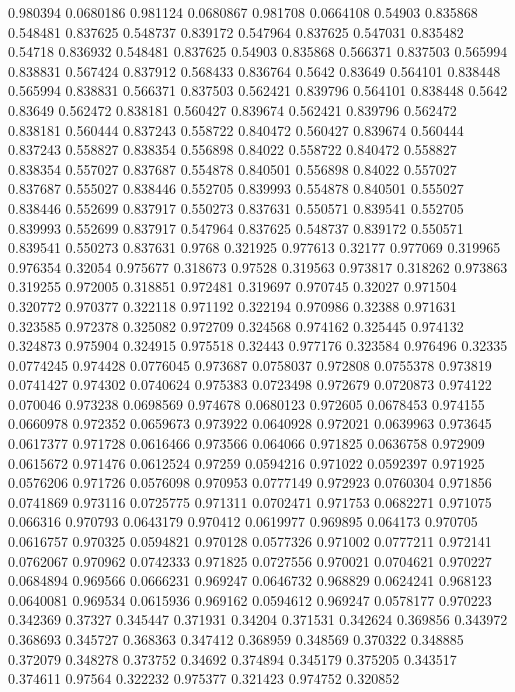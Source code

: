 0.980394 0.0680186
0.981124 0.0680867
0.981708 0.0664108
0.54903 0.835868
0.548481 0.837625
0.548737 0.839172
0.547964 0.837625
0.547031 0.835482
0.54718 0.836932
0.548481 0.837625
0.54903 0.835868
0.566371 0.837503
0.565994 0.838831
0.567424 0.837912
0.568433 0.836764
0.5642 0.83649
0.564101 0.838448
0.565994 0.838831
0.566371 0.837503
0.562421 0.839796
0.564101 0.838448
0.5642 0.83649
0.562472 0.838181
0.560427 0.839674
0.562421 0.839796
0.562472 0.838181
0.560444 0.837243
0.558722 0.840472
0.560427 0.839674
0.560444 0.837243
0.558827 0.838354
0.556898 0.84022
0.558722 0.840472
0.558827 0.838354
0.557027 0.837687
0.554878 0.840501
0.556898 0.84022
0.557027 0.837687
0.555027 0.838446
0.552705 0.839993
0.554878 0.840501
0.555027 0.838446
0.552699 0.837917
0.550273 0.837631
0.550571 0.839541
0.552705 0.839993
0.552699 0.837917
0.547964 0.837625
0.548737 0.839172
0.550571 0.839541
0.550273 0.837631
0.9768 0.321925
0.977613 0.32177
0.977069 0.319965
0.976354 0.32054
0.975677 0.318673
0.97528 0.319563
0.973817 0.318262
0.973863 0.319255
0.972005 0.318851
0.972481 0.319697
0.970745 0.32027
0.971504 0.320772
0.970377 0.322118
0.971192 0.322194
0.970986 0.32388
0.971631 0.323585
0.972378 0.325082
0.972709 0.324568
0.974162 0.325445
0.974132 0.324873
0.975904 0.324915
0.975518 0.32443
0.977176 0.323584
0.976496 0.32335
0.0774245 0.974428
0.0776045 0.973687
0.0758037 0.972808
0.0755378 0.973819
0.0741427 0.974302
0.0740624 0.975383
0.0723498 0.972679
0.0720873 0.974122
0.070046 0.973238
0.0698569 0.974678
0.0680123 0.972605
0.0678453 0.974155
0.0660978 0.972352
0.0659673 0.973922
0.0640928 0.972021
0.0639963 0.973645
0.0617377 0.971728
0.0616466 0.973566
0.064066 0.971825
0.0636758 0.972909
0.0615672 0.971476
0.0612524 0.97259
0.0594216 0.971022
0.0592397 0.971925
0.0576206 0.971726
0.0576098 0.970953
0.0777149 0.972923
0.0760304 0.971856
0.0741869 0.973116
0.0725775 0.971311
0.0702471 0.971753
0.0682271 0.971075
0.066316 0.970793
0.0643179 0.970412
0.0619977 0.969895
0.064173 0.970705
0.0616757 0.970325
0.0594821 0.970128
0.0577326 0.971002
0.0777211 0.972141
0.0762067 0.970962
0.0742333 0.971825
0.0727556 0.970021
0.0704621 0.970227
0.0684894 0.969566
0.0666231 0.969247
0.0646732 0.968829
0.0624241 0.968123
0.0640081 0.969534
0.0615936 0.969162
0.0594612 0.969247
0.0578177 0.970223
0.342369 0.37327
0.345447 0.371931
0.34204 0.371531
0.342624 0.369856
0.343972 0.368693
0.345727 0.368363
0.347412 0.368959
0.348569 0.370322
0.348885 0.372079
0.348278 0.373752
0.34692 0.374894
0.345179 0.375205
0.343517 0.374611
0.97564 0.322232
0.975377 0.321423
0.974752 0.320852
